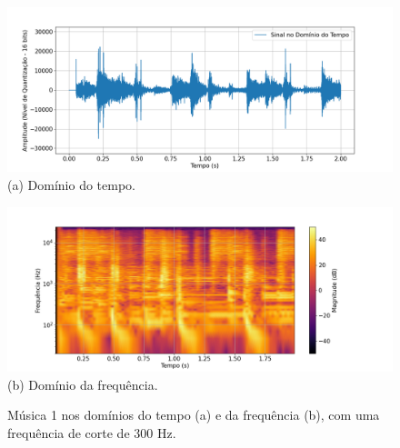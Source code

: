 \begin{figure}[htpb]
    \centering
    \begin{minipage}[b]{0.7\textwidth}
        \centering
        \includegraphics[width=\textwidth]{figuras/fig28.png}
        \vspace{0.3cm} %
        (a) Domínio do tempo.
    \end{minipage}
    \hspace{0.5cm} %

    \begin{minipage}[b]{0.7\textwidth}
        \centering
        \includegraphics[width=\textwidth]{figuras/fig29.png}
        \vspace{0.3cm} %
        (b) Domínio da frequência.
    \end{minipage}

    \caption{Música 1 nos domínios do tempo (a) e da frequência (b), com uma frequência de corte de 300 Hz.}
    \label{fig28}
\end{figure}


